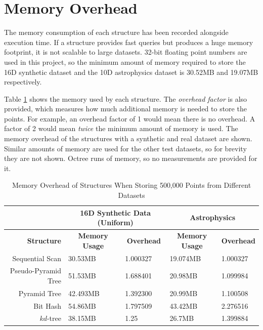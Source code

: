 \section{Memory Overhead}

The memory consumption of each structure has been recorded alongside execution time. If a structure provides fast queries but produces a huge memory footprint, it is not scalable to large datasets. 32-bit floating point numbers are used in this project, so the minimum amount of memory required to store the 16D synthetic dataset and the 10D astrophysics dataset is 30.52MB and 19.07MB respectively.

Table \ref{tab:memory-overhead} shows the memory used by each structure. The \textit{overhead factor} is also provided, which measures how much additional memory is needed to store the points. For example, an overhead factor of 1 would mean there is no overhead. A factor of 2 would mean \textit{twice} the minimum amount of memory is used. The memory overhead of the structures with a synthetic and real dataset are shown. Similar amounts of memory are used for the other test datasets, so for brevity they are not shown. Octree runs of memory, so no measurements are provided for it.

\begin{table}
	\centering
	\begin{tabular}{|r|l|l|l|l|}
		\hline
		& \multicolumn{2}{|c|}{\textbf{16D Synthetic Data (Uniform)}} & \multicolumn{2}{|c|}{\textbf{Astrophysics}} \\ 
		\hline
		\textbf{Structure} & \multicolumn{1}{|c|}{\textbf{Memory Usage}} & \multicolumn{1}{|c|}{\textbf{Overhead}} & \multicolumn{1}{|c|}{\textbf{Memory Usage}} & \multicolumn{1}{|c|}{\textbf{Overhead}} \\
		\hline
		Sequential Scan & 30.53MB & 1.000327 & 19.074MB & 1.000327 \\
		Pseudo-Pyramid Tree & 51.53MB & 1.688401 & 20.98MB & 1.099984 \\
		Pyramid Tree & 42.493MB & 1.392300 & 20.99MB & 1.100508 \\
		Bit Hash & 54.86MB & 1.797509 & 43.42MB & 2.276516 \\
		$kd$-tree & 38.15MB & 1.25 & 26.7MB & 1.399884 \\
		\hline
	\end{tabular}
	\caption{Memory Overhead of Structures When Storing 500,000 Points from Different Datasets}
	\label{tab:memory-overhead}
\end{table}

